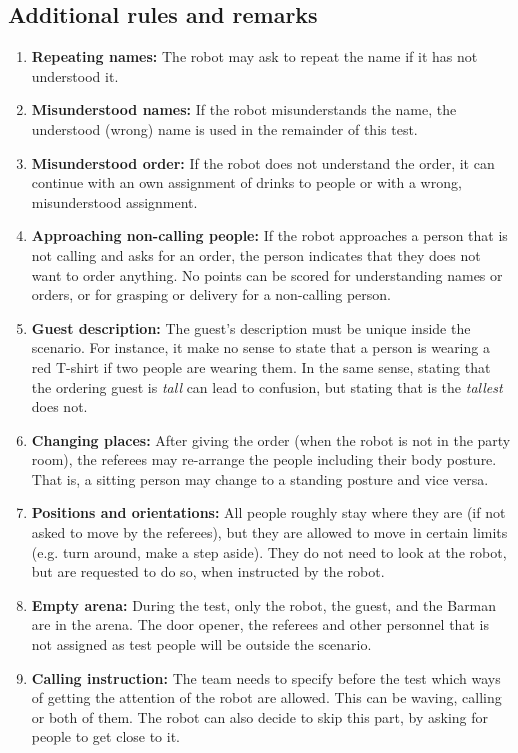 \subsection{Additional rules and remarks}
\begin{enumerate}
	\item \textbf{Repeating names:} The robot may ask to repeat the name if it has not understood it.

	\item \textbf{Misunderstood names:} If the robot misunderstands the name, the understood (wrong) name is used in the remainder of this test.

	\item \textbf{Misunderstood order:} If the robot does not understand the order, it can continue with an own assignment of drinks to people or with a wrong, misunderstood assignment.

	\item \textbf{Approaching non-calling people:} If the robot approaches a person that is not calling and asks for an order, the person indicates that they does not want to order anything. No points can be scored for understanding names or orders, or for grasping or delivery for a non-calling person.

	\item \textbf{Guest description:} The guest's description must be unique inside the scenario. For instance, it make no sense to state that a person is wearing a red T-shirt if two people are wearing them. In the same sense, stating that the ordering guest is \textit{tall} can lead to confusion, but stating that is the \textit{tallest} does not.

	\item \textbf{Changing places:} After giving the order (when the robot is not in the party room), the referees may re-arrange the people including their body posture. That is, a sitting person may change to a standing posture and vice versa.

	\item \textbf{Positions and orientations:} All people roughly stay where they are (if not asked to move by the referees), but they are allowed to move in certain limits (e.g. turn around, make a step aside). They do not need to look at the robot, but are requested to do so, when instructed by the robot.

	\item \textbf{Empty arena:} During the test, only the robot, the guest, and the Barman are in the arena. The door opener, the referees and other personnel that is not assigned as test people will be outside the scenario.

	\item \textbf{Calling instruction:} The team needs to specify before the test which ways of getting the attention of the robot are allowed. This can be waving, calling or both of them. The robot can also decide to skip this part, by asking for people to get close to it.
\end{enumerate}

